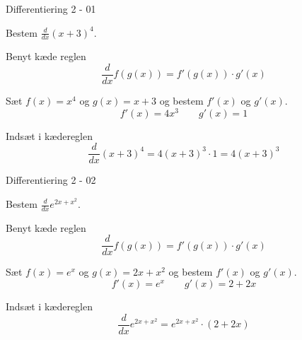 \documentclass{article}
\begin{document}
\tableofcontents
\newpage

\begin{exercise}{Differentiering 2 - 01}

Bestem $\frac{d}{dx} (x + 3)^4$.


\hint
Benyt kæde reglen
\[
\frac{d}{dx} f(g(x)) = f'(g(x)) \cdot g'(x)
\]

\hint
Sæt $f(x) = x^4$ og $g(x) = x + 3$ og bestem $f'(x)$ og $g'(x)$.
\[
f'(x) = 4 x^3 \qquad g'(x) = 1
\]

\hint
Indsæt i kædereglen
\[
\frac{d}{dx} (x + 3)^4 = 4 (x + 3)^3 \cdot 1 = 4 (x + 3)^3
\]

\end{exercise}

\begin{exercise}{Differentiering 2 - 02}

Bestem $\frac{d}{dx} e^{2x + x^2}$.


\hint
Benyt kæde reglen
\[
\frac{d}{dx} f(g(x)) = f'(g(x)) \cdot g'(x)
\]

\hint
Sæt $f(x) = e^x$ og $g(x) = 2x + x^2$ og bestem $f'(x)$ og $g'(x)$.
\[
f'(x) = e^x \qquad g'(x) = 2 + 2x
\]

\hint
Indsæt i kædereglen
\[
\frac{d}{dx} e^{2x + x^2} = e^{2x + x^2} \cdot (2 + 2x)
\]

\end{exercise}
\end{document}
